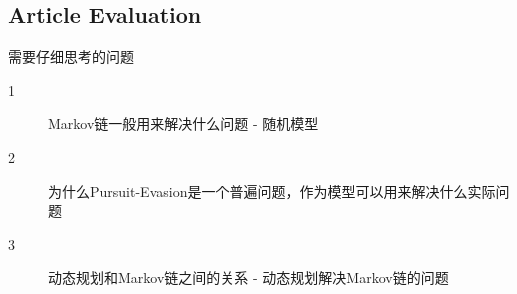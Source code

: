 \documentclass[
10pt, %
a4paper, %
onecolumn, %
portrait %
]{article}
\begin{document}
\begin{CJK*}{UTF8}{gbsn}













\section*{Article Evaluation}
需要仔细思考的问题
\begin{description}
\item[1]  Markov链一般用来解决什么问题 - 随机模型
\item[2]  为什么Pursuit-Evasion是一个普遍问题，作为模型可以用来解决什么实际问题
\item[3]  动态规划和Markov链之间的关系 - 
动态规划解决Markov链的问题

\end{description}




\renewcommand{\refname}{Reference} %


\end{CJK*}
\end{document}
